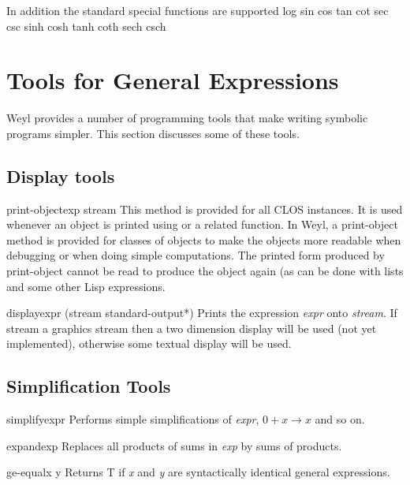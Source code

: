 In addition the standard special functions are supported
log
sin cos tan cot sec csc
sinh cosh tanh coth sech csch

\section{Tools for General Expressions}

Weyl provides a number of programming tools that make writing symbolic
programs simpler.  This section discusses some of these tools. 

\subsection{Display tools}
\label{DisplayTools:Sec}

\begin{functiondef}{print-object}{exp stream}
This method is provided for all CLOS instances.  It is used whenever
an object is printed using  or a related function.  In
Weyl, a {\sf print-object} method is provided for classes of objects to
make the objects more readable when debugging or when doing simple
computations.  The printed form produced by {\sf print-object} cannot
be read to produce the object again (as can be done with lists and some
other Lisp expressions.
\end{functiondef}

\begin{functiondef}{display}{expr \optional (stream {\sf *standard-output*})}
Prints the expression {\em expr} onto {\em stream}.  If stream a
graphics stream then a two dimension display will be used (not
yet implemented), otherwise some textual display will be used.
\end{functiondef}

\subsection{Simplification Tools}

\begin{functiondef}{simplify}{expr}
Performs simple simplifications of {\em expr}, $0 + x \rightarrow x$
and so on.
\end{functiondef}

\begin{functiondef}{expand}{exp}
Replaces all products of sums in {\em exp} by sums of products.
\end{functiondef}

\begin{functiondef}{ge-equal}{x y}
Returns {\sf T} if {\em x} and {\em y} are syntactically identical
general expressions.
\end{functiondef}

